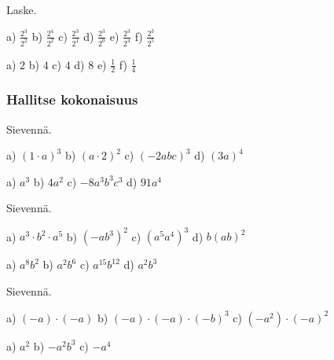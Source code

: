 Laske.
  \begin{tehtava}
        a) $\displaystyle \frac{2^3}{2^2}$ \qquad
        b) $\displaystyle \frac{2^4}{2^2}$ \qquad
        c) $\displaystyle \frac{2^3}{2^1}$ \qquad
        d) $\displaystyle \frac{2^3}{2^0}$ \qquad
        e) $\displaystyle \frac{2^3}{2^4}$ \qquad
        f) $\displaystyle \frac{2^3}{2^5}$
        
        \begin{vastaus}
            a) $2$ \qquad
            b) $4$ \qquad
            c) $4$ \qquad
            d) $8$ \qquad
            e) $\frac{1}{2}$ \qquad
            f) $\frac{1}{4}$
        \end{vastaus}
    \end{tehtava}

\subsubsection*{Hallitse kokonaisuus}

Sievennä.
 \begin{tehtava}
        a) $(1\cdot a)^3$ \qquad
        b) $(a\cdot 2)^2$ \qquad
        c) $(-2abc)^3$ \qquad
        d) $(3a)^4$

        \begin{vastaus}
            a) $a^3$ \qquad
            b) $4a^2$ \qquad
            c) $-8a^3b^3c^3$ \qquad
            d) $91a^4$
        \end{vastaus}
    \end{tehtava}

Sievennä.
 \begin{tehtava}
        a) $a^3\cdot b^2\cdot a^5$ \qquad
        b) $(-ab^3)^2$ \qquad
        c) $(a^5a^4)^3$ \qquad
        d) $b(ab)^2$

        \begin{vastaus}
            a) $a^8b^2$ \qquad
            b) $a^2b^6$ \qquad
            c) $a^{15}b^{12}$ \qquad
            d) $a^2b^3$
        \end{vastaus}
    \end{tehtava}

Sievennä.
    \begin{tehtava}
        a) $(-a)\cdot(-a)$ \qquad
        b) $(-a)\cdot(-a)\cdot(-b)^3$ \qquad
        c) $(-a^2)\cdot(-a)^2$

        \begin{vastaus}
            a) $a^2$ \qquad
            b) $-a^2b^3$ \qquad
            c) $-a^4$
        \end{vastaus}
    \end{tehtava}

